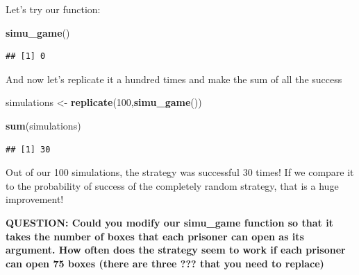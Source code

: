\documentclass[]{book}
\newenvironment{Shaded}{\begin{snugshade}}{\end{snugshade}}
\newcommand{\DecValTok}[1]{\textcolor[rgb]{0.00,0.00,0.81}{#1}}
\newcommand{\KeywordTok}[1]{\textcolor[rgb]{0.13,0.29,0.53}{\textbf{#1}}}
\newcommand{\NormalTok}[1]{#1}
\newcommand{\StringTok}[1]{\textcolor[rgb]{0.31,0.60,0.02}{#1}}
\begin{document}
Let's try our function:

\begin{Shaded}
\begin{Highlighting}[]
\KeywordTok{simu_game}\NormalTok{()}
\end{Highlighting}
\end{Shaded}

\begin{verbatim}
## [1] 0
\end{verbatim}

And now let's replicate it a hundred times and make the sum of all the success

\begin{Shaded}
\begin{Highlighting}[]
\NormalTok{simulations <-}\StringTok{ }\KeywordTok{replicate}\NormalTok{(}\DecValTok{100}\NormalTok{,}\KeywordTok{simu_game}\NormalTok{())}

\KeywordTok{sum}\NormalTok{(simulations)}
\end{Highlighting}
\end{Shaded}

\begin{verbatim}
## [1] 30
\end{verbatim}

Out of our 100 simulations, the strategy was successful 30 times! If we compare it to the probability of success of the completely random strategy, that is a huge improvement!

\textbf{QUESTION: Could you modify our simu\_game function so that it takes the number of boxes that each prisoner can open as its argument. How often does the strategy seem to work if each prisoner can open 75 boxes (there are three ??? that you need to replace)}
\end{document}
